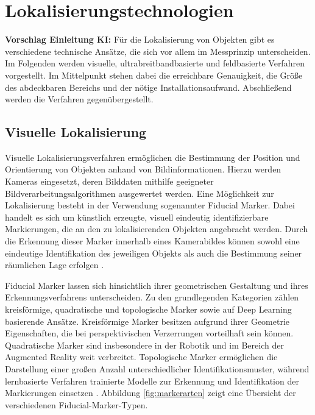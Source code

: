 \section{Lokalisierungstechnologien}
\label{sec:Lokalisierungstechnologien}
\textbf{Vorschlag Einleitung KI:} Für die Lokalisierung von Objekten gibt es verschiedene technische Ansätze, die sich vor allem im Messprinzip unterscheiden. Im Folgenden werden visuelle, ultrabreitbandbasierte und feldbasierte Verfahren vorgestellt. Im Mittelpunkt stehen dabei die erreichbare Genauigkeit, die Größe des abdeckbaren Bereichs und der nötige Installationsaufwand. Abschließend werden die Verfahren gegenübergestellt.
\subsection{Visuelle Lokalisierung}

Visuelle Lokalisierungsverfahren ermöglichen die Bestimmung der Position und Orientierung von Objekten anhand von Bildinformationen. Hierzu werden Kameras eingesetzt, deren Bilddaten mithilfe geeigneter Bildverarbeitungsalgorithmen ausgewertet werden. Eine Möglichkeit zur Lokalisierung besteht in der Verwendung sogenannter Fiducial Marker. Dabei handelt es sich um künstlich erzeugte, visuell eindeutig identifizierbare Markierungen, die an den zu lokalisierenden Objekten angebracht werden. Durch die Erkennung dieser Marker innerhalb eines Kamerabildes können sowohl eine eindeutige Identifikation des jeweiligen Objekts als auch die Bestimmung seiner räumlichen Lage erfolgen \cite{Kalaitzakis2021}.

Fiducial Marker lassen sich hinsichtlich ihrer geometrischen Gestaltung und ihres Erkennungsverfahrens unterscheiden. Zu den grundlegenden Kategorien zählen kreisförmige, quadratische und topologische Marker sowie auf Deep Learning basierende Ansätze. Kreisförmige Marker besitzen aufgrund ihrer Geometrie Eigenschaften, die bei perspektivischen Verzerrungen vorteilhaft sein können. Quadratische Marker sind insbesondere in der Robotik und im Bereich der Augmented Reality weit verbreitet. Topologische Marker ermöglichen die Darstellung einer großen Anzahl unterschiedlicher Identifikationsmuster, während lernbasierte Verfahren trainierte Modelle zur Erkennung und Identifikation der Markierungen einsetzen \cite{Kuzmenko2025}. Abbildung \ref{fig:markerarten} zeigt eine Übersicht der verschiedenen Fiducial-Marker-Typen.

